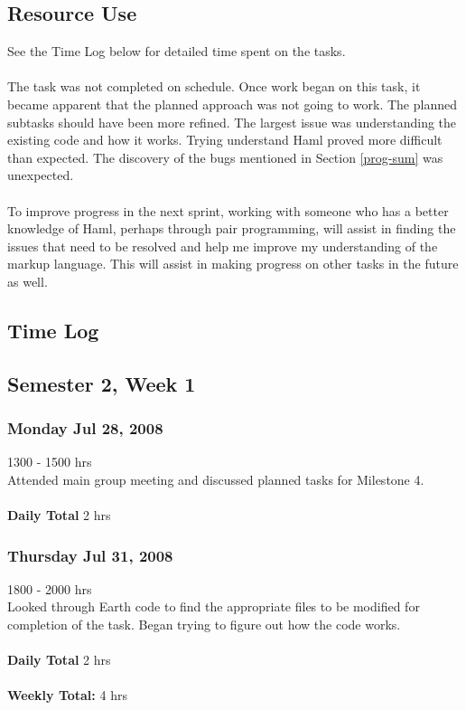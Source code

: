 \documentclass[10pt,a4,oneside]{article}
\begin{document}
\subsection*{Resource Use}
See the Time Log below for detailed time spent on the tasks.\\
\\
The task was not completed on schedule. Once work began on this task, it became apparent that the planned approach was not going to work. The planned subtasks should have been more refined. The largest issue was understanding the existing code and how it works. Trying understand Haml proved more difficult than expected. The discovery of the bugs mentioned in Section \ref{prog-sum} was unexpected.\\
\\
To improve progress in the next sprint, working with someone who has a better knowledge of Haml, perhaps through pair programming, will assist in finding the issues that need to be resolved and help me improve my understanding of the markup language. This will assist in making progress on other tasks in the future as well.

\subsection*{Time Log}
\label{time-log}
\subsection*{Semester 2, Week 1}
\subsubsection*{Monday Jul 28, 2008}
1300 - 1500 hrs\\
Attended main group meeting and discussed planned tasks for Milestone 4.\\
\\
\textbf{Daily Total} 2 hrs\\

\subsubsection*{Thursday Jul 31, 2008}
1800 - 2000 hrs\\
Looked through Earth code to find the appropriate files to be modified for completion of the task. Began trying to figure out how the code works.\\
\\
\textbf{Daily Total} 2 hrs\\
\\
\textbf{Weekly Total:} 4 hrs
\end{document}
